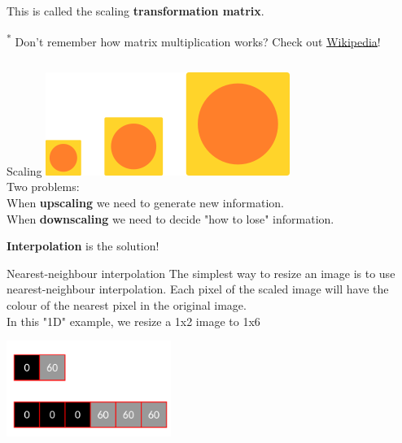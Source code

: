 \documentclass[9pt, aspectratio=169]{beamer}
\begin{document}
\begin{frame}
\begin{columns}
\begin{column}{0.6\textwidth}
            \begin{center}
                This is called the scaling \color{red}\textbf{transformation matrix}.\\
                \color{black}
            \end{center}

            \footnotesize
            \textsuperscript{*} Don't remember how matrix multiplication works? Check out \href{https://en.wikipedia.org/wiki/Matrix_multiplication}{\underline{Wikipedia}}!
        \end{column}
    \end{columns}
\end{frame}

\begin{frame}
    {Scaling}
    \centering
    \includegraphics[width=.5\textwidth]{scaling.png}\\
    Two problems:\\
    When \textbf{upscaling} we need to generate new information.
    \\
    When \textbf{downscaling} we need to decide "how to lose" information.

    \textbf{Interpolation} is the solution!
\end{frame}

\begin{frame}
    {Nearest-neighbour interpolation}
    The simplest way to resize an image is to use nearest-neighbour interpolation. Each pixel of the scaled image will have the colour of the nearest pixel in the original image.\\

    In this "1D" example, we resize a 1x2 image to 1x6

    \centering
    \includegraphics[width = 0.4\textwidth]{1D_NN_interpolation.png}
\end{frame}
\end{document}
